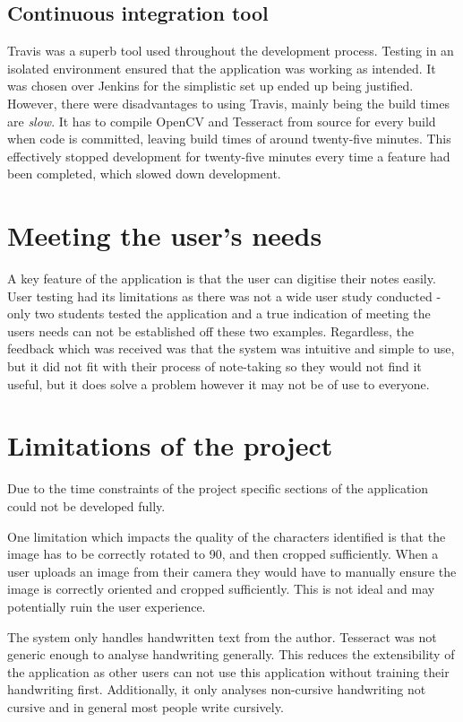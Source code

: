 \subsection{Continuous integration tool}
Travis was a superb tool used throughout the development process. Testing in an isolated environment ensured that the application was working as intended. It was chosen over Jenkins for the simplistic set up ended up being justified. However, there were disadvantages to using Travis, mainly being the build times are \textit{slow}. It has to compile OpenCV and Tesseract from source for every build when code is committed, leaving build times of around twenty-five minutes. This effectively stopped development for twenty-five minutes every time a feature had been completed, which slowed down development.

\section{Meeting the user's needs}
A key feature of the application is that the user can digitise their notes easily. User testing had its limitations as there was not a wide user study conducted - only two students tested the application and a  true indication of meeting the users needs can not be established off these two examples.  Regardless, the feedback which was received was that the system was intuitive and simple to use, but it did not fit with their process of note-taking so they would not find it useful, but it does solve a problem however it may not be of use to everyone.


\section{Limitations of the project}
Due to the time constraints of the project specific sections of the application could not be developed fully.

One limitation which impacts the quality of the characters identified is that the image has to be correctly rotated to 90\textdegree, and then cropped sufficiently. When a user uploads an image from their camera they would have to manually ensure the image is correctly oriented and cropped sufficiently. This is not ideal and may potentially ruin the user experience.

The system only handles handwritten text from the author. Tesseract was not generic enough to analyse handwriting generally. This reduces the extensibility of the application as other users can not use this application without training their handwriting first. Additionally, it only analyses non-cursive handwriting not cursive and in general most people write cursively.

